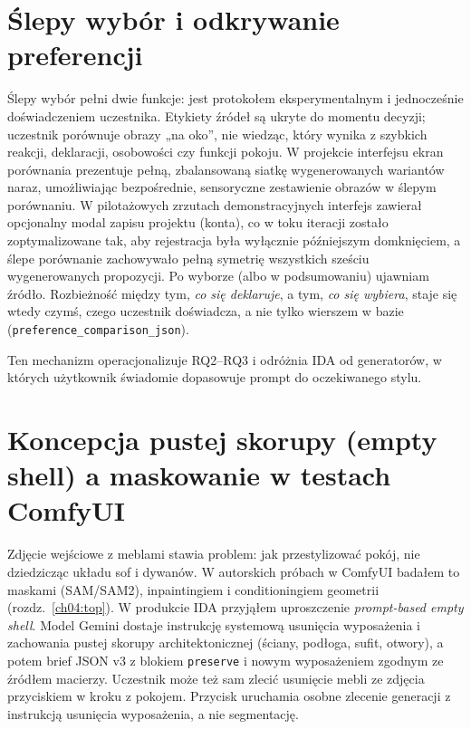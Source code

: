 \section{Ślepy wybór i odkrywanie preferencji}
\label{ch07:sec:slepy-wybor}

Ślepy wybór pełni dwie funkcje: jest protokołem eksperymentalnym i jednocześnie doświadczeniem uczestnika. Etykiety źródeł są ukryte do momentu decyzji; uczestnik porównuje obrazy „na oko”, nie wiedząc, który wynika z szybkich reakcji, deklaracji, osobowości czy funkcji pokoju.
W projekcie interfejsu ekran porównania prezentuje pełną, zbalansowaną siatkę wygenerowanych wariantów naraz, umożliwiając bezpośrednie, sensoryczne zestawienie obrazów w ślepym porównaniu. W pilotażowych zrzutach demonstracyjnych interfejs zawierał opcjonalny modal zapisu projektu (konta), co w toku iteracji zostało zoptymalizowane tak, aby rejestracja była wyłącznie późniejszym domknięciem, a ślepe porównanie zachowywało pełną symetrię wszystkich sześciu wygenerowanych propozycji.
Po wyborze (albo w podsumowaniu) ujawniam źródło. Rozbieżność między tym, \emph{co się deklaruje}, a tym, \emph{co się wybiera}, staje się wtedy czymś, czego uczestnik doświadcza, a nie tylko wierszem w bazie (\texttt{preference\_comparison\_json}).

Ten mechanizm operacjonalizuje RQ2--RQ3 i odróżnia IDA od generatorów, w których użytkownik świadomie dopasowuje prompt do oczekiwanego stylu.

\section{Koncepcja pustej skorupy (empty shell) a maskowanie w testach ComfyUI}
\label{ch07:sec:empty-shell}

Zdjęcie wejściowe z meblami stawia problem: jak przestylizować pokój, nie dziedzicząc układu sof i dywanów. W autorskich próbach w ComfyUI badałem to maskami (SAM/SAM2), inpaintingiem i conditioningiem geometrii (rozdz.~\ref{ch04:top}).
W produkcie IDA przyjąłem uproszczenie \emph{prompt-based empty shell}. Model Gemini dostaje instrukcję systemową usunięcia wyposażenia i zachowania pustej skorupy architektonicznej (ściany, podłoga, sufit, otwory), a potem brief JSON v3 z blokiem \texttt{preserve} i nowym wyposażeniem zgodnym ze źródłem macierzy.
Uczestnik może też sam zlecić usunięcie mebli ze zdjęcia przyciskiem w kroku z pokojem. Przycisk uruchamia osobne zlecenie generacji z instrukcją usunięcia wyposażenia, a nie segmentację.

